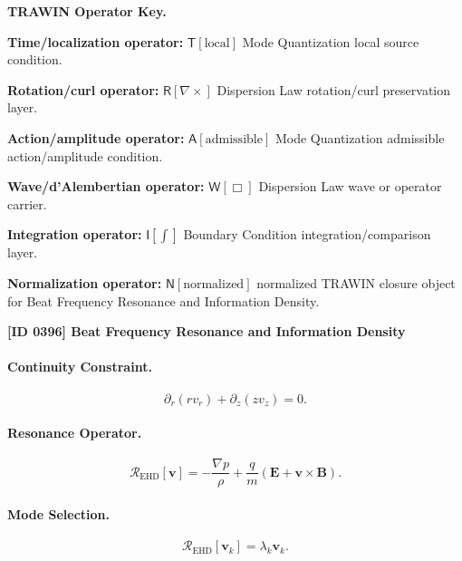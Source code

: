 \par\vspace{0.45\baselineskip}
\noindent\begin{minipage}[t]{\linewidth}
\begingroup
\small
\raggedright
\textbf{TRAWIN Operator Key.}\par
\noindent\textbf{Time/localization operator:} $\mathsf{T}\!\left[\mathrm{local}\right]$ Mode Quantization local source condition.\par
\noindent\textbf{Rotation/curl operator:} $\mathsf{R}\!\left[\nabla\times\right]$ Dispersion Law rotation/curl preservation layer.\par
\noindent\textbf{Action/amplitude operator:} $\mathsf{A}\!\left[\mathrm{admissible}\right]$ Mode Quantization admissible action/amplitude condition.\par
\noindent\textbf{Wave/d'Alembertian operator:} $\mathsf{W}\!\left[\Box\right]$ Dispersion Law wave or operator carrier.\par
\noindent\textbf{Integration operator:} $\mathsf{I}\!\left[\int\right]$ Boundary Condition integration/comparison layer.\par
\noindent\textbf{Normalization operator:} $\mathsf{N}\!\left[\mathrm{normalized}\right]$ normalized TRAWIN closure object for Beat Frequency Resonance and Information Density.\par
\endgroup
\end{minipage}

\clearpage
\noindent\textbf{[ID 0396] Beat Frequency Resonance and Information Density}\par
\vspace{0.35em}
\paragraph{Continuity Constraint.}
\begin{equation}
\partial_r(rv_r)+\partial_z(zv_z)=0.
\end{equation}

\paragraph{Resonance Operator.}
\begin{equation}
\mathcal{R}_{\mathrm{EHD}}[\mathbf{v}]
=
-\frac{\nabla p}{\rho}
+
\frac{q}{m}
(\mathbf{E}+\mathbf{v}\times\mathbf{B}).
\end{equation}

\paragraph{Mode Selection.}
\begin{equation}
\mathcal{R}_{\mathrm{EHD}}[\mathbf{v}_k]
=
\lambda_k\mathbf{v}_k.
\end{equation}

